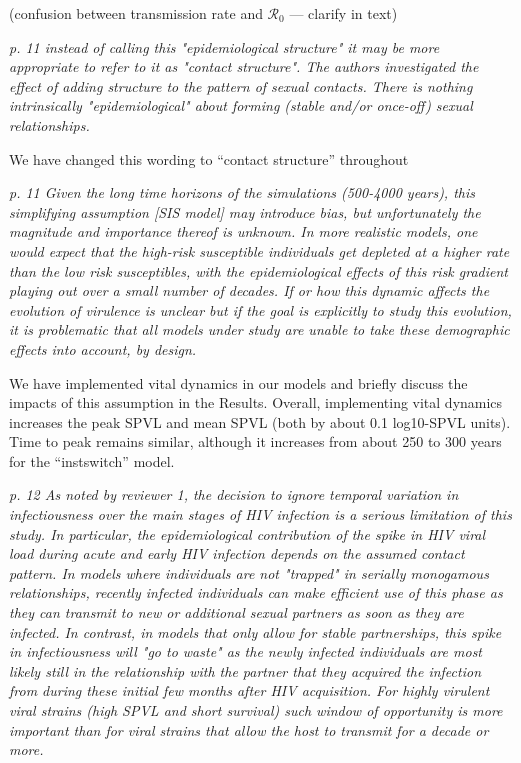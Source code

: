 \documentclass[10pt]{letter}
\newcommand{\revcomment}[1]{\emph{#1}}
\newcommand{\response}[1]{#1}
\begin{document}
\begin{letter}{
}
\response{(confusion between transmission rate and  ${\mathcal R}_0$ ---
  clarify in text)
}

\revcomment{
p. 11 instead of calling this "epidemiological structure" it may be more appropriate to refer to it as "contact structure". The authors investigated the effect of adding structure to the pattern of sexual contacts. There is nothing intrinsically "epidemiological" about forming (stable and/or once-off) sexual relationships.
}

\response{
  We have changed this wording to ``contact structure'' throughout
}

\revcomment{
p. 11 Given the long time horizons of the simulations (500-4000
years), this simplifying assumption [SIS model] may introduce bias, but unfortunately the magnitude and importance thereof is unknown. In more realistic models, one would expect that the high-risk susceptible individuals get depleted at a higher rate than the low risk susceptibles, with the epidemiological effects of this risk gradient playing out over a small number of decades. If or how this dynamic affects the evolution of virulence is unclear but if the goal is explicitly to study this evolution, it is problematic that all models under study are unable to take these demographic effects into account, by design.
}

\response{
We have implemented vital dynamics in our models and briefly discuss the impacts of this assumption in the Results.
Overall, implementing vital dynamics increases the peak SPVL and mean SPVL (both by about 0.1 log10-SPVL units). 
Time to peak remains similar, although it increases from about 250 to 300 years for the ``instswitch'' model.

}

\revcomment{
p. 12 As noted by reviewer 1, the decision to ignore temporal variation in
infectiousness over the main stages of HIV infection is a serious
limitation of this study. In particular, the epidemiological
contribution of the spike in HIV viral load during acute and early HIV
infection depends on the assumed contact pattern. In models where
individuals are not "trapped" in serially monogamous relationships,
recently infected individuals can make efficient use of this phase as
they can transmit to new or additional sexual partners as soon as they
are infected. In contrast, in models that only allow for stable
partnerships, this spike in infectiousness will "go to waste" as the
newly infected individuals are most likely still in the relationship
with the partner that they acquired the infection from during these
initial few months after HIV acquisition. For highly virulent viral
strains (high SPVL and short survival) such window of opportunity is
more important than for viral strains that allow the host to transmit
for a decade or more.
}


\end{letter}
\end{document}
